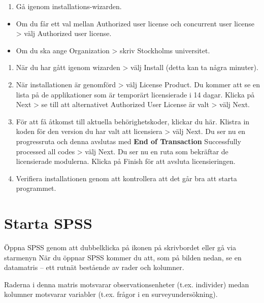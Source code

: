 \documentclass[
]{book}
\providecommand{\tightlist}{%
  \setlength{\itemsep}{0pt}\setlength{\parskip}{0pt}}
\begin{document}
\begin{enumerate}
\def\labelenumi{\arabic{enumi}.}
\tightlist
\item
  Gå igenom installations-wizarden.
\end{enumerate}

\begin{itemize}
\item
  Om du får ett val mellan Authorized user license och concurrent user license \textgreater{} välj Authorized user license.
\item
  Om du ska ange Organization \textgreater{} skriv Stockholms universitet.
\end{itemize}

\begin{enumerate}
\def\labelenumi{\arabic{enumi}.}
\setcounter{enumi}{1}
\item
  När du har gått igenom wizarden \textgreater{} välj Install (detta kan ta några minuter).
\item
  När installationen är genomförd \textgreater{} välj License Product. Du kommer att se en lista på de applikationer som är temporärt licensierade i 14 dagar. Klicka på Next \textgreater{} se till att alternativet Authorized User License är valt \textgreater{} välj Next.
\item
  För att få åtkomst till aktuella behörighetskoder, klickar du här. Klistra in koden för den version du har valt att licensiera \textgreater{} välj Next. Du ser nu en progressruta och denna avslutas med \textbf{End of Transaction} Successfully processed all codes \textgreater{} välj Next. Du ser nu en ruta som bekräftar de licensierade modulerna. Klicka på Finish för att avsluta licensieringen.
\item
  Verifiera installationen genom att kontrollera att det går bra att starta programmet.
\end{enumerate}

\hypertarget{starta-spss}{%
\section{Starta SPSS}\label{starta-spss}}

Öppna SPSS genom att dubbelklicka på ikonen på skrivbordet eller gå via starmenyn När du öppnar SPSS kommer du att, som på bilden nedan, se en datamatris -- ett rutnät bestående av rader och kolumner.

Raderna i denna matris motsvarar observationsenheter (t.ex. individer) medan kolumner motsvarar variabler (t.ex. frågor i en surveyundersökning).
\end{document}
